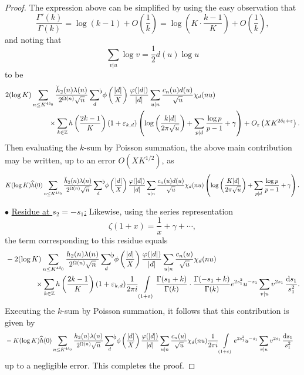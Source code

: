 \documentclass[a4paper,10pt,twoside]{amsart}
\theoremstyle{definition}
\numberwithin{equation}{section}
\newcommand\Z{\mathbb{Z}}
\newcommand\eps{\varepsilon}
\renewcommand\:{\colon}
\newcommand{\sumflat}{\mathop{{\sum}^{\raisebox{-3pt}{\makebox[0pt][l]{$\flat$}}}}}
\begin{document}
\begin{proof}
The expression above can be simplified by using the easy observation that 
\[\frac{\Gamma'(k)}{\Gamma(k)}=\log(k-1)+O\left(\frac 1k\right)=\log\left(K\cdot\frac{k-1}K\right)+O\left(\frac 1k\right),
\]
and noting that 
\[ 
\sum_{v|u}\log v=\frac12 d(u)\log u\]
to be
\begin{align*}
&2(\log K)\sum_{n\leq K^{4\delta_0}}\frac{\breve h_2(n)\lambda(n)}{2^{\Omega(n)}\sqrt n}\sumflat_{d}\,\phi\left(\frac{|d|}X\right)\frac{\varphi(|d|)}{|d|}\sum_{u|n}\frac{c_n(u)d(u)}{\sqrt u}\chi_d(nu)\\
&\qquad\qquad\qquad\times\sum_{k\in\Z}h\left(\frac{2k-1}K\right)(1+\varepsilon_{k,d})\left(\log\left(\frac{k|d|}{2\pi\sqrt u}\right)+\sum_{p|d}\frac{\log p}{p-1}+\gamma\right)+O_\eps\left(XK^{2\delta_0+\eps} \right).
\end{align*}
Then evaluating the $k$-sum by Poisson summation, the above main contribution may be written, up to an error $O(XK^{1/2})$, as
\begin{align*}
K(\log K)\widehat h(0)\sum_{n\leq K^{4\delta_0}}\frac{\breve h_2(n)\lambda(n)}{2^{\Omega(n)}\sqrt n}\sumflat_{d}\,\phi\left(\frac{|d|}X\right)\frac{\varphi(|d|)}{|d|}\sum_{u|n}\frac{c_n(u)d(u)}{\sqrt u}\chi_d(nu)\left(\log\left(\frac{K|d|}{2\pi\sqrt u}\right)+\sum_{p|d}\frac{\log p}{p-1}+\gamma\right).
\end{align*}

\noindent $\bullet$ \underline{Residue at $s_2=-s_1$:} Likewise, using the series representation 
\[\zeta(1+x)=\frac1{x}+\gamma+\cdots,\]
the term corresponding to this residue equals 
\begin{align*}
&-2(\log K)\sum_{n\leq K^{4\delta_0}}\frac{h_2(n)\lambda(n)}{2^{\Omega(n)}\sqrt n}\sumflat_{d}\,\phi\left(\frac{|d|}X\right)\frac{\varphi(|d|)}{|d|}\sum_{u|n}\frac{c_n(u)}{\sqrt u}\chi_d(nu)\\
&\qquad\qquad\times\sum_{k\in\Z}h\left(\frac{2k-1}K\right)(1+\varepsilon_{k,d})\frac1{2\pi i}\int\limits_{(1+\eps)}\frac{\Gamma(s_1+k)}{\Gamma(k)}\cdot\frac{\Gamma(-s_1+k)}{\Gamma(k)}e^{2s_1^2}u^{-s_1}\sum_{v|u}v^{2s_1}\,\frac{\mathrm d s_1}{s_1^2}. 
\end{align*}
Executing the $k$-sum by Poisson summation, it follows that this contribution is given by  
\begin{align}\label{diagonal-second-part}
&-K(\log K)\widehat h(0)\sum_{n\leq K^{4\delta_0}}\frac{h_2(n)\lambda(n)}{2^{\Omega(n)}\sqrt n}\sumflat_{d}\,\phi\left(\frac{|d|}X\right)\frac{\varphi(|d|)}{|d|}\sum_{u|n}\frac{c_n(u)}{\sqrt u}\chi_d(nu)\frac1{2\pi i}\int\limits_{(1+\eps)}e^{2s_1^2}u^{-s_1}\sum_{v|u}v^{2s_1}\,\frac{\mathrm d s_1}{s_1^2}
\end{align}
up to a negligible error. This completes the proof.
\end{proof}
\end{document}
